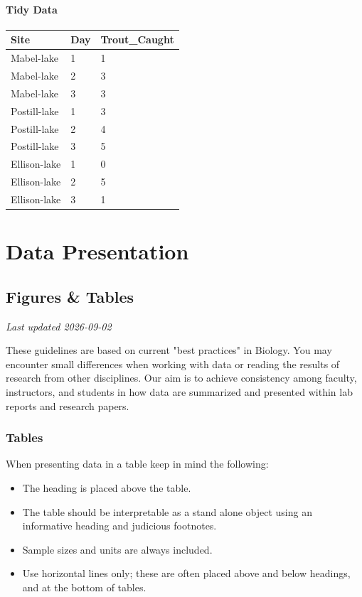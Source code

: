 \documentclass[
]{book}
\newcounter{none} %
\providecommand{\tightlist}{%
  \setlength{\itemsep}{0pt}\setlength{\parskip}{0pt}}
\begin{document}
\subsection*{Tidy Data}\label{tidy-data-2}

{\def\LTcaptype{none} %
\begin{longtable}[]{@{}lll@{}}
\toprule\noalign{}
Site & Day & Trout\_Caught \\
\midrule\noalign{}
\endhead
\bottomrule\noalign{}
\endlastfoot
Mabel-lake & 1 & 1 \\
Mabel-lake & 2 & 3 \\
Mabel-lake & 3 & 3 \\
Postill-lake & 1 & 3 \\
Postill-lake & 2 & 4 \\
Postill-lake & 3 & 5 \\
Ellison-lake & 1 & 0 \\
Ellison-lake & 2 & 5 \\
Ellison-lake & 3 & 1 \\
\end{longtable}
}

\part*{Data Presentation}\label{part-data-presentation}

\chapter{Figures \& Tables}\label{figures-tables}

\emph{Last updated 2026-09-02}

These guidelines are based on current "best practices" in Biology. You may encounter small differences when working with data or reading the results of research from other disciplines. Our aim is to achieve consistency among faculty, instructors, and students in how data are summarized and presented within lab reports and research papers.

\section{Tables}\label{tables}

When presenting data in a table keep in mind the following:

\begin{itemize}
\tightlist
\item
  The heading is placed above the table.
\item
  The table should be interpretable as a stand alone object using an informative heading and judicious footnotes.
\item
  Sample sizes and units are always included.
\item
  Use horizontal lines only; these are often placed above and below headings, and at the bottom of tables.
\end{itemize}
\end{document}
